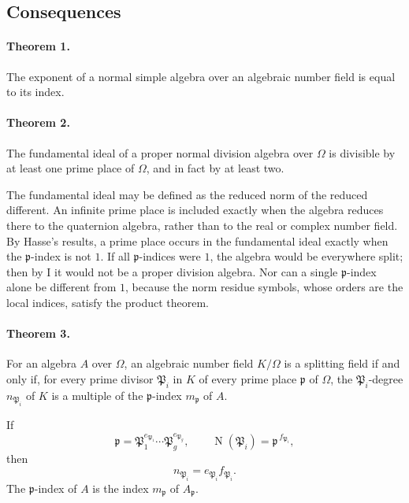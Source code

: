 \documentclass[11pt]{article}
\providecommand{\Om}{\Omega}
\providecommand{\N}{\operatorname{N}}
\begin{document}
\subsection*{Consequences}

\paragraph{Theorem 1.}
The exponent of a normal simple algebra over an algebraic number field is equal to its index.

\paragraph{Theorem 2.}
The fundamental ideal of a proper normal division algebra over \(\Om\) is divisible by at least one prime place of \(\Om\), and in fact by at least two.

The fundamental ideal may be defined as the reduced norm of the reduced different. An infinite prime place is included exactly when the algebra reduces there to the quaternion algebra, rather than to the real or complex number field. By Hasse's results, a prime place occurs in the fundamental ideal exactly when the \(\mathfrak p\)-index is not \(1\). If all \(\mathfrak p\)-indices were \(1\), the algebra would be everywhere split; then by I it would not be a proper division algebra. Nor can a single \(\mathfrak p\)-index alone be different from \(1\), because the norm residue symbols, whose orders are the local indices, satisfy the product theorem.

\paragraph{Theorem 3.}
For an algebra \(A\) over \(\Om\), an algebraic number field \(K/\Om\) is a splitting field if and only if, for every prime divisor \(\mathfrak P_i\) in \(K\) of every prime place \(\mathfrak p\) of \(\Om\), the \(\mathfrak P_i\)-degree \(n_{\mathfrak P_i}\) of \(K\) is a multiple of the \(\mathfrak p\)-index \(m_{\mathfrak p}\) of \(A\).

If
\[
        \mathfrak p=\mathfrak P_1^{e_{\mathfrak P_1}}\cdots
        \mathfrak P_g^{e_{\mathfrak P_g}},
        \qquad
        \N(\mathfrak P_i)=\mathfrak p^{\,f_{\mathfrak P_i}},
\]
then
\[
        n_{\mathfrak P_i}=e_{\mathfrak P_i}f_{\mathfrak P_i}.
\]
The \(\mathfrak p\)-index of \(A\) is the index \(m_{\mathfrak p}\) of \(A_{\mathfrak p}\).
\end{document}
